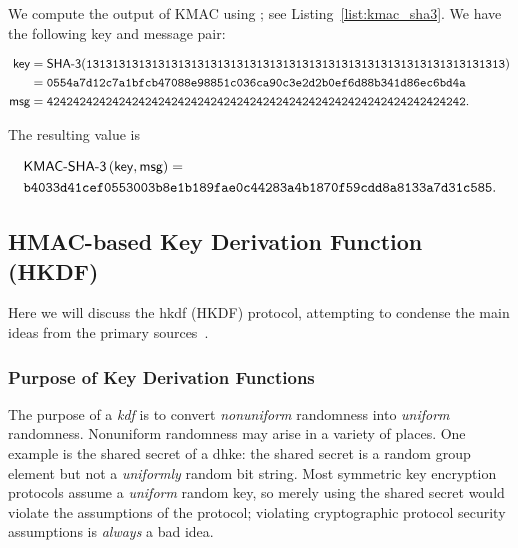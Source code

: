 \begin{example}

We compute the output of KMAC using \ShaThree{};
see Listing~\ref{list:kmac_sha3}.
We have the following key and message pair:

\begin{align}
    \textsf{key} &=
    \textsf{\ShaThree{}}(
    \texttt{1313131313131313131313131313131313131313131313131313131313131313})
        \nonumber\\
    &= \texttt{0554a7d12c7a1bfcb47088e98851c036ca90c3e2d2b0ef6d88b341d86ec6bd4a}
        \nonumber\\
    \textsf{msg} &= 
    \texttt{4242424242424242424242424242424242424242424242424242424242424242}.
\end{align}

\noindent
The resulting value is

\begin{align}
    &\textsf{KMAC-\ShaThree{}}\parens{\textsf{key},\textsf{msg}} = \nonumber\\
    &\texttt{b4033d41cef0553003b8e1b189fae0c44283a4b1870f59cdd8a8133a7d31c585}.
\end{align}


\end{example}


\subsection{HMAC-based Key Derivation Function (HKDF)}
\label{app:crypto_hkdf}

Here we will discuss the \gls{hkdf} (HKDF) protocol,
attempting to condense the main ideas from
the primary sources~\cite{HKDF2010,rfc5869}.

\subsubsection{Purpose of Key Derivation Functions}

The purpose of a \emph{\gls{kdf}}
is to convert \emph{nonuniform} randomness into \emph{uniform} randomness.
Nonuniform randomness may arise in a variety of places.
One example is the \gls{shared secret} of a \gls{dhke}:
the \gls{shared secret} is a random group element
but not a \emph{uniformly} random bit string.
Most \gls{symmetric key encryption} protocols assume a
\emph{uniform} random key,
so merely using the \gls{shared secret} would violate the assumptions
of the protocol;
violating cryptographic protocol security assumptions is
\emph{always} a bad idea.

